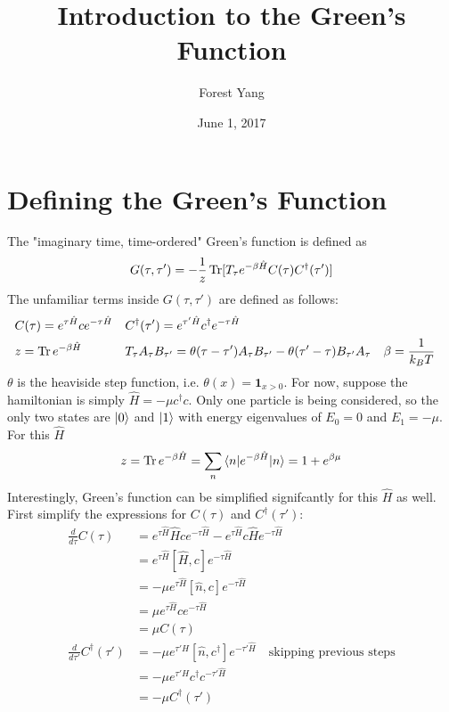 \documentclass{article}
\title{Introduction to the Green's Function}
\author{Forest Yang}
\date{June 1, 2017}
\begin{document}
\maketitle
\section{Defining the Green's Function}
The "imaginary time, time-ordered" Green's function is defined as 
\begin{equation*} G(\tau, \tau') = -\frac{1}{z}\operatorname{Tr}[T_{\tau}e^{-\beta \hat{H}} C(\tau) C^\dagger(\tau')] \end{equation*}
The unfamiliar terms inside $G(\tau, \tau')$ are defined as follows:
\begin{align*}
\begin{aligned}
&C(\tau) = e^{\tau\hat{H}}ce^{-\tau\hat{H}} && C^\dagger(\tau') = e^{\tau'\hat{H}}c^\dagger e^{-\tau\hat{H}} \\
&z = \operatorname{Tr} e^{-\beta\hat{H}} &&  T_\tau A_\tau B_{\tau'} = \operatorname{\theta}(\tau - \tau')A_\tau B_{\tau'} - \operatorname{\theta}(\tau' - \tau)B_{\tau'}A_\tau && \beta=\frac{1}{k_BT}  \\
\end{aligned}
\end{align*}
$\theta$ is the heaviside step function, i.e. $\theta(x) = \mathbf{1}_{x >0}$. For now, suppose the hamiltonian is simply $\hat{H} = -\mu c^\dagger c$. Only one particle is being considered, so the only two states are $\ket{0}$ and $\ket{1}$ with energy eigenvalues of $E_0 = 0$ and $E_1 = -\mu$. For this $\hat{H}$
\begin{equation*} z = \operatorname{Tr} e^{-\beta\hat{H}} = \sum_{n} \braket{n|e^{-\beta\hat{H}}|n} = 1 + e^{\beta\mu} \end{equation*}
Interestingly, Green's function can be simplified signifcantly for this $\hat{H}$ as well. First simplify the expressions for $C(\tau)$ and $C^\dagger(\tau')$: 
\begin{align*}
\frac{d}{d\tau}C(\tau) &= e^{\tau\hat{H}} \hat{H} c e^{-\tau\hat{H}} - e^{\tau\hat{H}} c \hat{H} e^{-\tau\hat{H}} \\
&= e^{\tau\hat{H}}[\hat{H}, c] e^{-\tau\hat{H}} \\
&= -\mu e^{\tau\hat{H}}[\hat{n}, c] e^{-\tau\hat{H}} \\
&= \mu e^{\tau\hat{H}}c e^{-\tau\hat{H}} \\
&= \mu C(\tau) \\
\frac{d}{d\tau'}C^\dagger(\tau') &= -\mu e^{\tau'\hat{H}}[\hat{n}, c^\dagger] e^{-\tau'\hat{H}} \quad \text{skipping previous steps} \\
&= -\mu e^{\tau'\hat{H}}c^\dagger c^{-\tau'\hat{H}}\\
&= -\mu C^\dagger(\tau') 
\end{align*}
\end{document}
